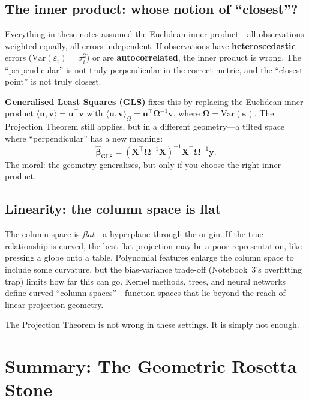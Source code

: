 \documentclass[11pt,a4paper]{article}
\theoremstyle{plain}
\theoremstyle{definition}
\newcommand{\bhat}{\hat{\bm{\beta}}}
\newcommand{\bX}{\bm{X}}
\newcommand{\by}{\bm{y}}
\newcommand{\ip}[2]{\langle #1, #2 \rangle}
\begin{document}
\subsection{The inner product: whose notion of ``closest''?}

Everything in these notes assumed the Euclidean inner product---all
observations weighted equally, all errors independent.
If observations have \textbf{heteroscedastic} errors
($\text{Var}(\varepsilon_i) = \sigma_i^2$) or are
\textbf{autocorrelated},
the inner product is wrong.
The ``perpendicular'' is not truly perpendicular in the correct metric,
and the ``closest point'' is not truly closest.

\textbf{Generalised Least Squares (GLS)} fixes this by replacing the
Euclidean inner product $\ip{\bm{u}}{\bm{v}}=\bm{u}^\top\bm{v}$ with
$\ip{\bm{u}}{\bm{v}}_\Omega = \bm{u}^\top\bm{\Omega}^{-1}\bm{v}$,
where $\bm{\Omega} = \text{Var}(\bm{\varepsilon})$.
The Projection Theorem still applies, but in a different geometry---a
tilted space where ``perpendicular'' has a new meaning:
\[
  \bhat_{\text{GLS}}
  = (\bX^\top\bm{\Omega}^{-1}\bX)^{-1}\bX^\top\bm{\Omega}^{-1}\by.
\]
The moral: the geometry generalises, but only if you choose the right
inner product.

\subsection{Linearity: the column space is flat}

The column space is \emph{flat}---a hyperplane through the origin.
If the true relationship is curved, the best flat projection may be
a poor representation, like pressing a globe onto a table.
Polynomial features enlarge the column space to include some curvature,
but the bias-variance trade-off (Notebook~3's overfitting trap) limits
how far this can go.
Kernel methods, trees, and neural networks define curved ``column
spaces''---function spaces that lie beyond the reach of linear
projection geometry.

The Projection Theorem is not wrong in these settings.  It is simply
not enough.


\section{Summary: The Geometric Rosetta Stone}\label{sec:rosetta}
\end{document}
